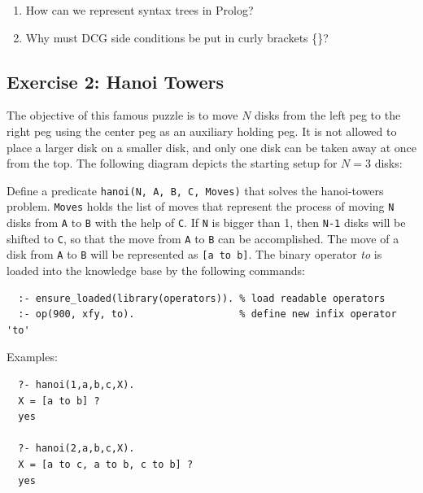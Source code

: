 \documentclass [11pt, a4wide, twoside]{article}
\begin{document}
\begin{enumerate}
\item How can we represent syntax trees in Prolog?

\item Why must DCG side conditions be put in curly brackets \{\}?

\end{enumerate}


\subsection*{Exercise 2: Hanoi Towers}
The objective of this famous puzzle is to move $N$ disks from the left peg to the right peg using the center peg as an auxiliary holding peg. It is not allowed to place a larger disk on a smaller disk, and only one disk can be taken away at once from the top. The following diagram depicts the starting setup for $N=3$ disks:
%
\begin{figure}[htb]
\end{figure}
%
\noindent Define a predicate \texttt{hanoi(N, A, B, C, Moves)} that solves the hanoi-towers problem. \texttt{Moves} holds the list of moves that represent the process of moving \texttt{N} disks from \texttt{A} to \texttt{B} with the help of \texttt{C}. If \texttt{N} is bigger than 1, then \texttt{N-1} disks will be shifted to \texttt{C}, so that the move from \texttt{A} to \texttt{B} can be accomplished. The move of a disk from \texttt{A} to \texttt{B} will be represented as \texttt{[a to b]}. The binary operator \emph{to} is loaded into the knowledge base by the following commands:
\begin{verbatim}
  :- ensure_loaded(library(operators)). % load readable operators
  :- op(900, xfy, to).                  % define new infix operator 'to'
\end{verbatim}
\noindent Examples:
\begin{verbatim}
  ?- hanoi(1,a,b,c,X).		
  X = [a to b] ?			
  yes					

  ?- hanoi(2,a,b,c,X).
  X = [a to c, a to b, c to b] ?
  yes
\end{verbatim}



\end{document}
